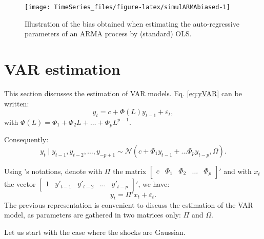 \documentclass[
  12pt,
]{book}
\theoremstyle{definition}
\theoremstyle{definition}
\theoremstyle{definition}
\theoremstyle{definition}
\theoremstyle{remark}
\begin{document}
\begin{figure}
\texttt{[image: TimeSeries\_files/figure-latex/simulARMAbiased-1]} \caption{Illustration of the bias obtained when estimating the auto-regressive parameters of an ARMA process by (standard) OLS.}\label{fig:simulARMAbiased}
\end{figure}

\hypertarget{estimVAR}{%
\section{VAR estimation}\label{estimVAR}}

This section discusses the estimation of VAR models. Eq. \eqref{eq:yVAR} can be written:
\[
y_{t}=c+\Phi(L)y_{t-1}+\varepsilon_{t},
\]
with \(\Phi(L) = \Phi_1 + \Phi_2 L + \dots + \Phi_p L^{p-1}\).

Consequently:
\[
y_{t}\mid y_{t-1},y_{t-2},\ldots,y_{-p+1}\sim \mathcal{N}(c+\Phi_{1}y_{t-1}+\ldots\Phi_{p}y_{t-p},\Omega).
\]

Using \citet{Hamilton_1994}'s notations, denote with \(\Pi\) the matrix \(\left[\begin{array}{ccccc} c & \Phi_{1} & \Phi_{2} & \ldots & \Phi_{p}\end{array}\right]'\) and with \(x_{t}\) the vector \(\left[\begin{array}{ccccc} 1 & y'_{t-1} & y'_{t-2} & \ldots & y'_{t-p}\end{array}\right]'\), we have:
\begin{equation}
y_{t}= \Pi'x_{t} + \varepsilon_{t}. \label{eq:PIVAR}
\end{equation}
The previous representation is convenient to discuss the estimation of the VAR model, as parameters are gathered in two matrices only: \(\Pi\) and \(\Omega\).

Let us start with the case where the shocks are Gaussian.
\end{document}
